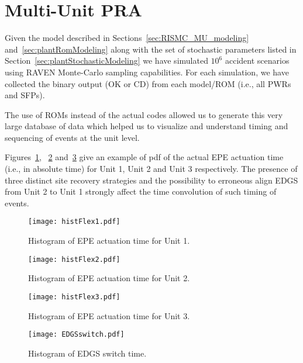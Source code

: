 \section{Multi-Unit PRA}
\label{sec:multiUnitPRA}

Given the model described in Sections~\ref{sec:RISMC_MU_modeling} and~\ref{sec:plantRomModeling} 
along with the set of stochastic parameters listed in Section~\ref{sec:plantStochasticModeling} we have 
simulated $10^6$ accident scenarios using RAVEN Monte-Carlo sampling
capabilities. For each simulation, we have collected the binary output (OK or CD) from 
each model/ROM (i.e., all PWRs and SFPs).

The use of ROMs instead of the actual codes allowed us to generate this very large 
database of data which helped us to visualize and understand timing and sequencing of events at 
the unit level.

Figures~\ref{fig:histFlex1}, ~\ref{fig:histFlex2} and~\ref{fig:histFlex3} give an example of pdf
of the actual EPE actuation time (i.e., in absolute time) for Unit 1, Unit 2 and Unit 3 respectively. 
The presence of three distinct site recovery strategies and the possibility to erroneous align
EDGS from Unit 2 to Unit 1 strongly affect the time convolution of such timing of events. 

\begin{figure}
    \centering
    \texttt{[image: histFlex1.pdf]}
    \caption{Histogram of EPE actuation time for Unit 1.}
    \label{fig:histFlex1}
\end{figure}

\begin{figure}
    \centering
    \texttt{[image: histFlex2.pdf]}
    \caption{Histogram of EPE actuation time for Unit 2.}
    \label{fig:histFlex2}
\end{figure}

\begin{figure}
    \centering
    \texttt{[image: histFlex3.pdf]}
    \caption{Histogram of EPE actuation time for Unit 3.}
    \label{fig:histFlex3}
\end{figure}

\begin{figure}
    \centering
    \texttt{[image: EDGSswitch.pdf]}
    \caption{Histogram of EDGS switch time.}
    \label{fig:EDGSswitch}
\end{figure}